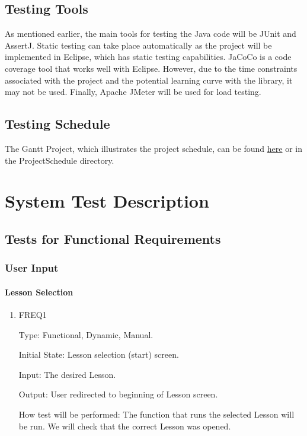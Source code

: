 \documentclass[12pt, titlepage]{article}
\begin{document}
\subsection{Testing Tools}
\label{sec:tt}

	As mentioned earlier, {\color{cyan}the main tools for testing the Java code will be JUnit and AssertJ}. Static testing can take place automatically as the project will be implemented in Eclipse, which has static testing capabilities. JaCoCo is a code coverage tool that works well with Eclipse. However, due to the time constraints associated with the project and the potential learning curve with the library, it may not be used. Finally, Apache JMeter will be used for load testing.

\subsection{Testing Schedule}
\label{sec:ts}
		
The Gantt Project, which illustrates the project schedule, can be found \href{run:../../ProjectSchedule/Gantt_Project.gan}{here} or in the ProjectSchedule directory. 

\section{System Test Description}
	
\subsection{Tests for Functional Requirements}

\subsubsection{User Input}
		
\paragraph{Lesson Selection}

\begin{enumerate}

\item{FREQ1\\}

Type: Functional, Dynamic, Manual.
					
Initial State: Lesson selection (start) screen.
					
Input: The desired Lesson.
					
Output: User redirected to beginning of Lesson screen.
					
How test will be performed: The function that runs the selected Lesson will be run. We will check that the correct Lesson was opened.

\end{enumerate}
\end{document}

